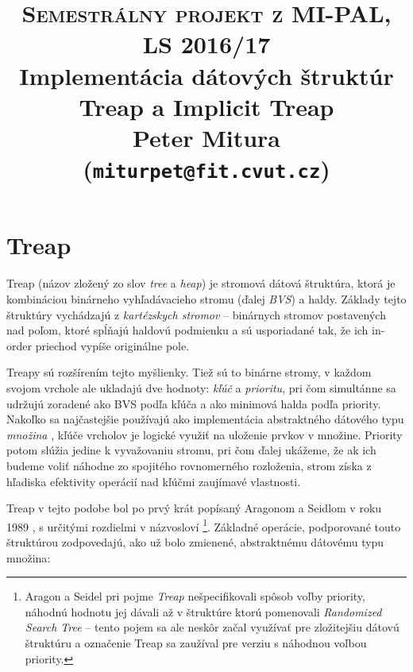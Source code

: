 \documentclass[a4paper, 12pt]{article}
\theoremstyle{definition}
\begin{document}
\title{\textsc{\large{Semestrálny projekt z MI-PAL, LS 2016/17}}\\
\vspace{1cm}
\large{Implementácia dátových štruktúr}\\
\Huge{Treap a Implicit Treap}\\
\vspace{1cm}
\normalsize{Peter Mitura (\texttt{miturpet@fit.cvut.cz})}}

\maketitle

\section{Treap}

Treap (názov zložený zo slov \emph{tree} a \emph{heap}) je stromová dátová
štruktúra, ktorá je kombináciou binárneho vyhľadávacieho stromu (ďalej
\emph{BVS}) a haldy.  Základy tejto štruktúry vychádzajú z \emph{kartézskych
stromov} \cite{cartesian} -- binárnych stromov postavených nad poľom, ktoré
spĺňajú haldovú podmienku a sú usporiadané tak, že ich in-order priechod vypíše
originálne pole.

Treapy sú rozšírením tejto myšlienky. Tiež sú to binárne stromy, v každom
svojom vrchole ale ukladajú dve hodnoty: \emph{kľúč} a \emph{prioritu}, pri čom
simultánne sa udržujú zoradené ako BVS podľa kľúča a ako minimová halda podľa
priority.  Nakoľko sa najčastejšie používajú ako implementácia abstraktného
dátového typu \emph{množina} , kľúče vrcholov je logické využiť na uloženie
prvkov v množine. Priority potom slúžia jedine k vyvažovaniu stromu, pri čom
ďalej ukážeme, že ak ich budeme voliť náhodne zo spojitého rovnomerného
rozloženia, strom získa z hľadiska efektivity operácií nad kľúčmi zaujímavé
vlastnosti.

Treap v tejto podobe bol po prvý krát popísaný Aragonom a Seidlom v roku 1989
\cite{treaps}, s určitými rozdielmi v názvosloví
\footnote{Aragon a Seidel
pri pojme \emph{Treap} nešpecifikovali spôsob voľby priority, náhodnú hodnotu
jej dávali až v štruktúre ktorú pomenovali \emph{Randomized Search Tree} --
tento pojem sa ale neskôr začal využívať pre zložitejšiu dátovú štruktúru a
označenie Treap sa zaužíval pre verziu s náhodnou voľbou priority.}.
Základné operácie, podporované touto štruktúrou zodpovedajú, ako už bolo
zmienené, abstraktnému dátovému typu množina:
\end{document}
